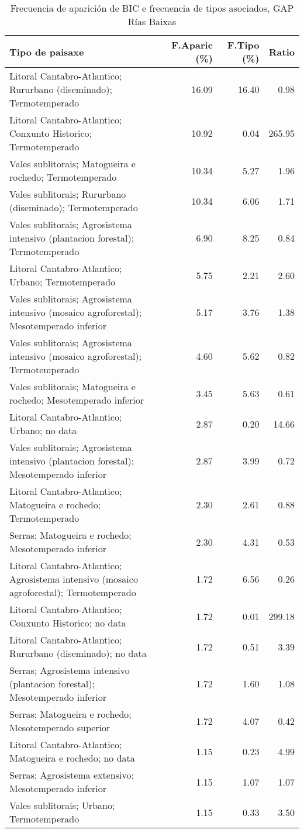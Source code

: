 \begin{table}[p]
\centering
\caption{Frecuencia de aparición de BIC e frecuencia de tipos asociados, GAP Rías Baixas} 
\label{vbic12}
\begin{tabular}{lrrr}
  \hline
Tipo de paisaxe & F.Aparic (\%) & F.Tipo (\%) & Ratio \\ 
  \hline
Litoral Cantabro-Atlantico; Rururbano (diseminado); Termotemperado & 16.09 & 16.40 & 0.98 \\ 
  Litoral Cantabro-Atlantico; Conxunto Historico; Termotemperado & 10.92 & 0.04 & 265.95 \\ 
  Vales sublitorais; Matogueira e rochedo; Termotemperado & 10.34 & 5.27 & 1.96 \\ 
  Vales sublitorais; Rururbano (diseminado); Termotemperado & 10.34 & 6.06 & 1.71 \\ 
  Vales sublitorais; Agrosistema intensivo (plantacion forestal); Termotemperado & 6.90 & 8.25 & 0.84 \\ 
  Litoral Cantabro-Atlantico; Urbano; Termotemperado & 5.75 & 2.21 & 2.60 \\ 
  Vales sublitorais; Agrosistema intensivo (mosaico agroforestal); Mesotemperado inferior & 5.17 & 3.76 & 1.38 \\ 
  Vales sublitorais; Agrosistema intensivo (mosaico agroforestal); Termotemperado & 4.60 & 5.62 & 0.82 \\ 
  Vales sublitorais; Matogueira e rochedo; Mesotemperado inferior & 3.45 & 5.63 & 0.61 \\ 
  Litoral Cantabro-Atlantico; Urbano; no data & 2.87 & 0.20 & 14.66 \\ 
  Vales sublitorais; Agrosistema intensivo (plantacion forestal); Mesotemperado inferior & 2.87 & 3.99 & 0.72 \\ 
  Litoral Cantabro-Atlantico; Matogueira e rochedo; Termotemperado & 2.30 & 2.61 & 0.88 \\ 
  Serras; Matogueira e rochedo; Mesotemperado inferior & 2.30 & 4.31 & 0.53 \\ 
  Litoral Cantabro-Atlantico; Agrosistema intensivo (mosaico agroforestal); Termotemperado & 1.72 & 6.56 & 0.26 \\ 
  Litoral Cantabro-Atlantico; Conxunto Historico; no data & 1.72 & 0.01 & 299.18 \\ 
  Litoral Cantabro-Atlantico; Rururbano (diseminado); no data & 1.72 & 0.51 & 3.39 \\ 
  Serras; Agrosistema intensivo (plantacion forestal); Mesotemperado inferior & 1.72 & 1.60 & 1.08 \\ 
  Serras; Matogueira e rochedo; Mesotemperado superior & 1.72 & 4.07 & 0.42 \\ 
  Litoral Cantabro-Atlantico; Matogueira e rochedo; no data & 1.15 & 0.23 & 4.99 \\ 
  Serras; Agrosistema extensivo; Mesotemperado inferior & 1.15 & 1.07 & 1.07 \\ 
  Vales sublitorais; Urbano; Termotemperado & 1.15 & 0.33 & 3.50 \\ 
   \hline
\end{tabular}
\end{table}
